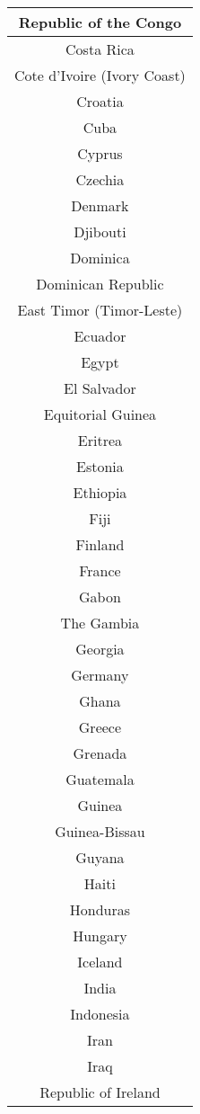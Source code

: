 \documentclass{article}
\begin{document}
\begin{center}
\begin{tabular} {|| c ||}
   Republic of the Congo\\ \hline 
   Costa Rica\\ \hline 
   Cote d'Ivoire (Ivory Coast)\\ \hline 
   Croatia\\ \hline 
   Cuba\\ \hline 
   Cyprus\\ \hline 
   Czechia\\ \hline 
   Denmark\\ \hline 
   Djibouti\\ \hline 
   Dominica\\ \hline 
   Dominican Republic\\ \hline 
   East Timor (Timor-Leste)\\ \hline 
   Ecuador\\ \hline 
   Egypt\\ \hline 
   El Salvador\\ \hline 
   Equitorial Guinea\\ \hline 
   Eritrea\\ \hline 
   Estonia\\ \hline 
   Ethiopia\\ \hline 
   Fiji\\ \hline 
   Finland\\ \hline 
   France\\ \hline 
   Gabon\\ \hline 
   The Gambia\\ \hline 
   Georgia\\ \hline 
   Germany\\ \hline 
   Ghana\\ \hline 
   Greece\\ \hline 
   Grenada\\ \hline 
   Guatemala\\ \hline 
   Guinea\\ \hline 
   Guinea-Bissau\\ \hline 
   Guyana\\ \hline 
   Haiti\\ \hline 
   Honduras\\ \hline 
   Hungary\\ \hline 
   Iceland\\ \hline 
   India\\ \hline 
   Indonesia\\ \hline 
   Iran\\ \hline 
   Iraq\\ \hline 
   Republic of Ireland\\ \hline 

\end{tabular}
\end{center}
\end{document}
